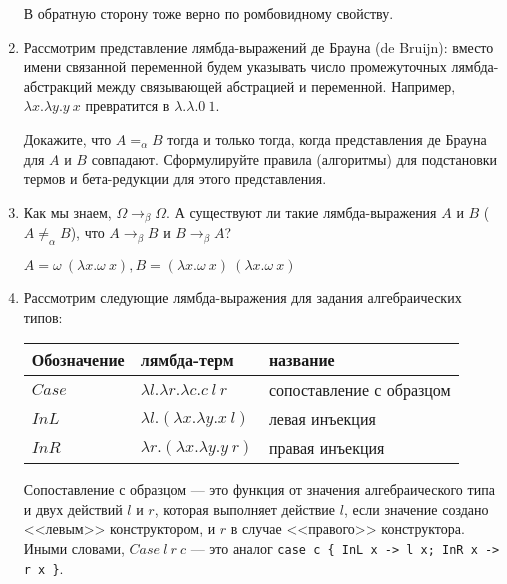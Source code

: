 \begin{enumerate}
\begin{solution}
              В обратную сторону тоже верно по ромбовидному свойству.
          \end{solution}

    \item Рассмотрим представление лямбда-выражений де Брауна (de Bruijn): вместо имени связанной переменной будем
          указывать число промежуточных лямбда-абстракций между связывающей абстрацией и переменной.
          Например, $\lambda x.\lambda y.y\ x$ превратится в $\lambda.\lambda.0\ 1$.

          Докажите, что $A =_\alpha B$ тогда и только тогда, когда представления де Брауна для $A$ и $B$ совпадают.
          Сформулируйте правила (алгоритмы) для подстановки термов и бета-редукции для этого представления.

    \item Как мы знаем, $\Omega \rightarrow_\beta \Omega$. А существуют ли такие лямбда-выражения
          $A$ и $B$ ($A \ne_\alpha B$), что $A \rightarrow_\beta B$ и $B \rightarrow_\beta A$?

          \begin{solution}
              \(A = \omega\ (\lambda x.\omega\ x), B = (\lambda x.\omega\ x)\ (\lambda x.\omega\ x)\)
          \end{solution}

    \item Рассмотрим следующие лямбда-выражения для задания алгебраических типов:

          \begin{tabular}{lll}
              Обозначение & лямбда-терм                             & название                 \\\hline
              $Case$      & $\lambda l.\lambda r.\lambda c.c\ l\ r$ & сопоставление с образцом \\
              $InL$       & $\lambda l.(\lambda x.\lambda y.x\ l)$  & левая инъекция           \\
              $InR$       & $\lambda r.(\lambda x.\lambda y.y\ r)$  & правая инъекция          \\
          \end{tabular}

          Сопоставление с образцом --- это функция от значения алгебраического типа и двух действий $l$ и $r$,
          которая выполняет действие $l$, если значение создано <<левым>> конструктором, и $r$ в случае
          <<правого>> конструктора. Иными словами, $Case\ l\ r\ c$ --- это аналог
          \verb!case c { InL x -> l x; InR x -> r x }!.


\end{enumerate}
